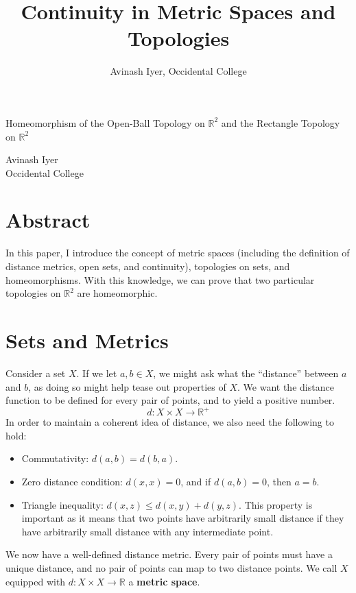 \documentclass[12pt]{extarticle}
\title{Continuity in Metric Spaces and Topologies}
\author{Avinash Iyer, Occidental College}
\date{}
\newcommand{\R}{\mathbb{R}}
\begin{document}
\doublespacing
  \begin{center}
    \large \sc Homeomorphism of the Open-Ball Topology on $\R^2$ and the Rectangle Topology on $\R^2$
  \end{center}
  \begin{center}
    Avinash Iyer\\
    Occidental College
  \end{center}
  \section*{Abstract}%
  In this paper, I introduce the concept of metric spaces (including the definition of distance metrics, open sets, and continuity), topologies on sets, and homeomorphisms. With this knowledge, we can prove that two particular topologies on $\R^2$ are homeomorphic.
  \section*{Sets and Metrics}%
  Consider a set $X$. If we let $a,b\in X$, we might ask what the ``distance'' between $a$ and $b$, as doing so might help tease out properties of $X$. We want the distance function to be defined for every pair of points, and to yield a positive number.
  \[
    d: X\times X \rightarrow \R^+
  \]
  In order to maintain a coherent idea of distance, we also need the following to hold:
  \begin{itemize}
    \item Commutativity: $d(a,b) = d(b,a)$.
    \item Zero distance condition: $d(x,x) = 0$, and if $d(a,b) = 0$, then $a = b$.
    \item Triangle inequality: $d(x,z) \leq d(x,y) + d(y,z)$. This property is important as it means that two points have arbitrarily small distance if they have arbitrarily small distance with any intermediate point.
  \end{itemize}
  We now have a well-defined distance metric. Every pair of points must have a unique distance, and no pair of points can map to two distance points. We call $X$ equipped with $d: X\times X \rightarrow \R$ a \textbf{metric space}.
\end{document}
